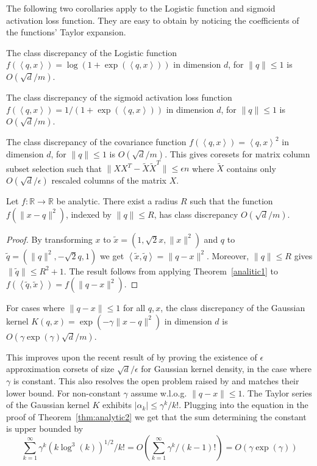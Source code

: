 \documentclass[12pt]{colt2019} %
\newcommand{\ip}[1]{\left \langle #1 \right \rangle}
\newcommand{\R}{\mathbb{R}}
\newcommand{\eps}{\epsilon}
\begin{document}
The following two corollaries apply to the Logistic function and sigmoid activation loss function. They are easy to obtain by noticing the coefficients of the functions' Taylor expansion.

\begin{corollary}\label{cdlogistic}
The class discrepancy of the Logistic function $f(\ip{q,x}) = \log(1+\exp(\ip{q,x}))$ in dimension $d$, for $\|q\| \leq 1$ is $O(\sqrt{d}/m)$.
\end{corollary}
\begin{corollary}\label{cdsigmoid}
The class discrepancy of the sigmoid activation loss function $f(\ip{q,x}) = 1/(1+\exp(\ip{q,x}))$ in dimension $d$, for $\|q\| \leq 1$ is $O(\sqrt{d}/m)$.
\end{corollary}


\begin{corollary}
The class discrepancy of the covariance function $f(\ip{q,x}) = \ip{q,x}^2$ in dimension $d$, for $\|q\| \leq 1$ is $O(\sqrt{d}/m)$. This gives coresets for matrix column subset selection such that $\|XX^T - \tilde X \tilde X^T\| \le \eps n$ where $\tilde X$ contains only $O(\sqrt{d}/\eps)$ rescaled columns of the matrix $X$.
\end{corollary}



\begin{theorem} \label{thm:analytic2}
Let $f:\R\rightarrow\R$ be analytic. There exist a radius $R$ such that the function $f(\|x-q\|^2)$, indexed by $\|q\| \leq R$, has class discrepancy $O(\sqrt{d}/m)$. 
\end{theorem}
\begin{proof}
By transforming $x$ to $\tilde{x} = (1, \sqrt{2}x, \|x\|^2)$ and $q$ to $\tilde{q} = (\|q\|^2, -\sqrt{2}q, 1)$ we get $\ip{\tilde{x},\tilde{q}} = \|q-x\|^2$. Moreover, $\|q\| \le R$ gives $\|\tilde q\| \le R^2+1$. The result follows from applying Theorem~\ref{analitic1} to $f(\ip{ \tilde q, \tilde x}) = f(\|q-x\|^2)$.
\end{proof}

\begin{corollary}
For cases where $\|q-x\| \leq 1$ for all $q,x$, the class discrepancy of the Gaussian kernel $K(q,x) = \exp(-\gamma \|x-q\|^2)$ in dimension $d$ is $O(\gamma\exp(\gamma)\sqrt{d}/m)$.
\end{corollary} 
This improves upon the recent result of \cite{DBLP:journals/corr/abs-1802-01751} by proving the existence of $\eps$ approximation corsets of size $\sqrt{d}/\eps$ for Gaussian kernel density, in the case where $\gamma$ is constant. 
This also resolves the open problem raised by \cite{DBLP:journals/corr/abs-1802-01751} and matches their lower bound.   
For non-constant $\gamma$ assume w.l.o.g. $\|q-x\| \le 1$. The Taylor series of the Gaussian kernel $K$ exhibits $|\alpha_k| \le \gamma^k/k!$.
Plugging into the equation in the proof of Theorem~\ref{thm:analytic2} we get that the sum determining the constant is upper bounded by
$$\sum_{k=1}^\infty \gamma^{k}(k\log^3(k))^{1/2}/k! = O\left(\sum_{k=1}^\infty \gamma^{k}/(k-1)!\right) = O\left(\gamma \exp(\gamma)\right)$$
\end{document}

